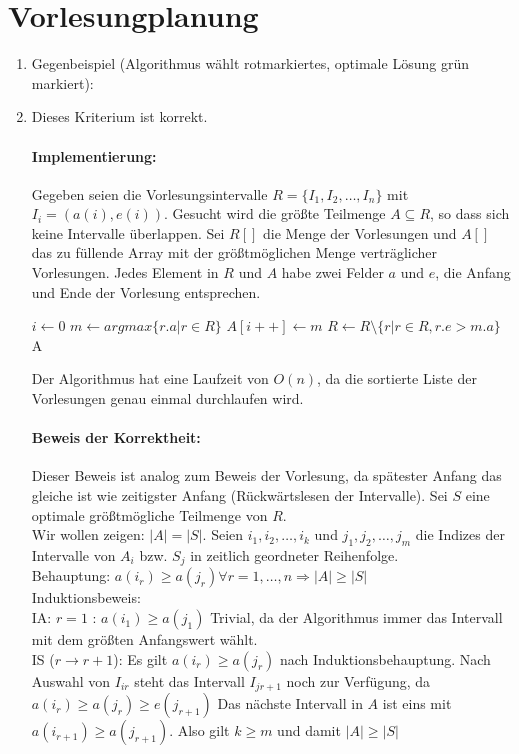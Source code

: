 \documentclass[a4paper,10pt]{scrartcl}
\begin{document}
\section{Vorlesungplanung}
\begin{enumerate}
 \item Gegenbeispiel (Algorithmus wählt rotmarkiertes, optimale Lösung grün markiert):
  \vfill

  \item Dieses Kriterium ist korrekt. 
    \paragraph*{Implementierung:}
	Gegeben seien die Vorlesungsintervalle $R = \{I_1, I_2, \hdots, I_n\}$ mit $I_i = (a(i), e(i))$.
	Gesucht wird die größte Teilmenge $A \subseteq R$, so dass sich keine Intervalle überlappen.
	Sei $R[]$ die Menge der Vorlesungen und $A[]$ das zu füllende
	Array mit der größtmöglichen Menge verträglicher Vorlesungen.
	Jedes Element in $R$ und $A$ habe zwei Felder $a$ und $e$, die
	Anfang und Ende der Vorlesung entsprechen.
	\begin{algorithmic}
		\STATE $i \gets 0$
			\STATE $m \gets argmax\{r.a | r \in R\}$
			\STATE $A[i++] \gets m$
			\STATE $R \gets R \setminus \{r | r \in R, r.e > m.a\}$
		\ENDWHILE
		\RETURN A
	\end{algorithmic}
	Der Algorithmus hat eine Laufzeit von $O(n)$, da die sortierte
	Liste der Vorlesungen genau einmal durchlaufen wird.

    \paragraph*{Beweis der Korrektheit:}
  Dieser Beweis ist analog zum Beweis der Vorlesung, da spätester Anfang das gleiche ist wie zeitigster Anfang (Rückwärtslesen der Intervalle).
  Sei $S$ eine optimale größtmögliche Teilmenge von $R$. \\
  Wir wollen zeigen: $|A| = |S|$. Seien $i_1, i_2, \hdots, i_k$ und $j_1, j_2, \hdots, j_m$ die Indizes der Intervalle von $A_i$ bzw. $S_j$ in zeitlich geordneter Reihenfolge.\\
  Behauptung: $a(i_r) \ge a(j_r) \forall r = 1, \hdots, n \Rightarrow |A| \ge |S|$\\
  Induktionsbeweis: \\
  IA: $r = 1$ : $a(i_1) \ge a(j_1)$ Trivial, da der Algorithmus immer das Intervall mit dem größten Anfangswert wählt. \\
  IS ($r \rightarrow r + 1$):
  Es gilt $a(i_r) \ge a(j_r)$ nach Induktionsbehauptung.
  Nach Auswahl von $I_{ir}$ steht das Intervall $I_{jr + 1}$ noch zur Verfügung, da $a(i_r) \ge a(j_r) \ge e(j_{r + 1})$
  Das nächste Intervall in $A$ ist eins mit $a(i_{r+1}) \ge a(j_{r+1})$. Also gilt $k \ge m$ und damit $|A| \ge |S|$
    


\end{enumerate}
\end{document}
